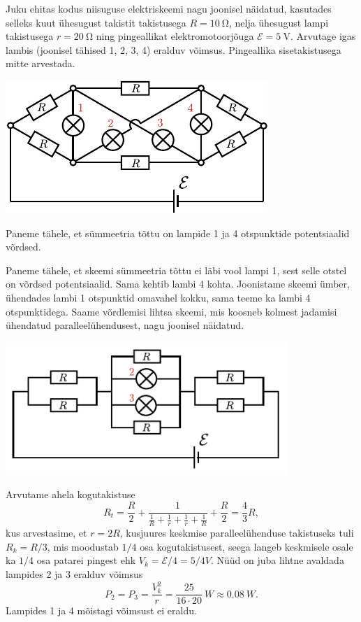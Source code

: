 
Juku ehitas kodus niisuguse elektriskeemi nagu joonisel näidatud, kasutades
selleks kuut ühesugust takistit takistusega $R=\SI{10}{\ohm}$, nelja
ühesugust lampi takistusega $r=\SI{20}{\ohm}$ ning pingeallikat
elektromotoorjõuga
$\mathcal{E}=\SI{5}{\volt}$. Arvutage igas lambis (joonisel tähised 1, 2, 3,
4) eralduv võimsus. Pingeallika sisetakistusega mitte arvestada.
\begin{center}
\includegraphics[width=0.6\linewidth]{2013-lahg-09-lambidJoonis-crop}
\end{center}

\hint
Paneme tähele, et sümmeetria tõttu on lampide 1 ja 4 otspunktide potentsiaalid võrdsed.

\solu
Paneme tähele, et skeemi sümmeetria tõttu ei läbi vool lampi 1, sest selle otstel on võrdsed potentsiaalid. Sama kehtib lambi 4 kohta. Joonistame skeemi ümber, ühendades lambi 1 otspunktid omavahel kokku, sama teeme ka lambi 4 otspunktidega. Saame võrdlemisi lihtsa skeemi, mis koosneb kolmest jadamisi ühendatud paralleelühendusest, nagu joonisel näidatud. 

\begin{center}
\includegraphics[width=0.8\textwidth]{2013-lahg-09-ahelLah.pdf}
\end{center}

Arvutame ahela kogutakistuse
\[R_t = \frac{R}{2} + \frac{1}{\frac{1}{R}+\frac{1}{r}+\frac{1}{r}+\frac{1}{R}}+\frac{R}{2} =\frac{4}{3}R,\]
kus arvestasime, et $r=2R$, kusjuures keskmise paralleelühenduse takistuseks tuli $R_k=R/3$, mis moodustab $1/4$ osa kogutakistusest, seega langeb keskmisele osale ka $1/4$ osa patarei pingest ehk $V_k = \mathcal{E}/4 = 5/4\si{V}$. Nüüd on juba lihtne avaldada lampides 2 ja 3 eralduv võimsus
\[P_2=P_3=\frac{V_k^2}{r}=\frac{25}{16\cdot 20}\SI{}{W}\approx\SI{0,08}{W}.\]
Lampides 1 ja 4 mõistagi võimsust ei eraldu.

